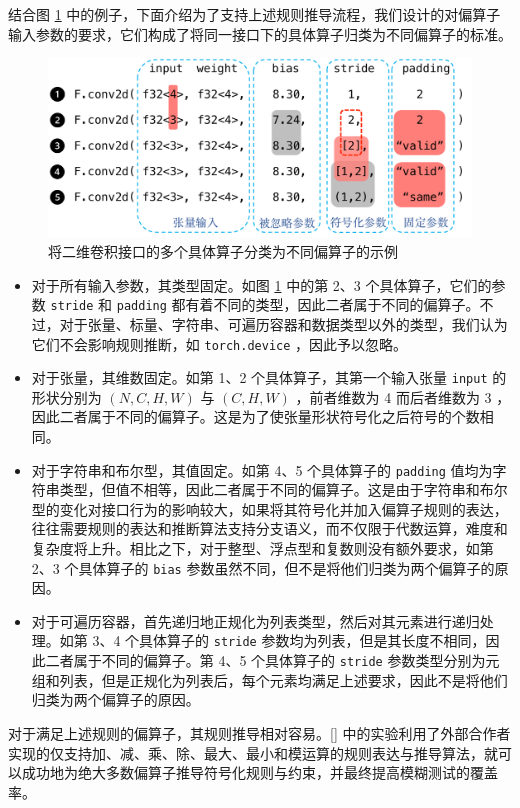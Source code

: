 结合图 \ref{fig:conv2d} 中的例子，下面介绍为了支持上述规则推导流程，我们设计的对偏算子输入参数的要求，它们构成了将同一接口下的具体算子归类为不同偏算子的标准。

\begin{figure}
    \centering
    \includegraphics[width=1.\linewidth]{thuthesis/figures/conv2d.pdf}
    \caption{将二维卷积接口的多个具体算子分类为不同偏算子的示例}
    \label{fig:conv2d}
\end{figure}

\begin{itemize}
    \item 对于所有输入参数，其类型固定。如图 \ref{fig:conv2d} 中的第 2、3 个具体算子，它们的参数 \texttt{stride} 和 \texttt{padding} 都有着不同的类型，因此二者属于不同的偏算子。不过，对于张量、标量、字符串、可遍历容器和数据类型以外的类型，我们认为它们不会影响规则推断，如 \texttt{torch.device} ，因此予以忽略。
    \item 对于张量，其维数固定。如第 1、2 个具体算子，其第一个输入张量 \texttt{input} 的形状分别为 $(N, C, H, W)$ 与 $(C, H, W)$ ，前者维数为 4 而后者维数为 3 ，因此二者属于不同的偏算子。这是为了使张量形状符号化之后符号的个数相同。
    \item 对于字符串和布尔型，其值固定。如第 4、5 个具体算子的 \texttt{padding} 值均为字符串类型，但值不相等，因此二者属于不同的偏算子。这是由于字符串和布尔型的变化对接口行为的影响较大，如果将其符号化并加入偏算子规则的表达，往往需要规则的表达和推断算法支持分支语义，而不仅限于代数运算，难度和复杂度将上升。相比之下，对于整型、浮点型和复数则没有额外要求，如第 2、3 个具体算子的 \texttt{bias} 参数虽然不同，但不是将他们归类为两个偏算子的原因。
    \item 对于可遍历容器，首先递归地正规化为列表类型，然后对其元素进行递归处理。如第 3、4 个具体算子的 \texttt{stride} 参数均为列表，但是其长度不相同，因此二者属于不同的偏算子。第 4、5 个具体算子的 \texttt{stride} 参数类型分别为元组和列表，但是正规化为列表后，每个元素均满足上述要求，因此不是将他们归类为两个偏算子的原因。
\end{itemize}
对于满足上述规则的偏算子，其规则推导相对容易。\ref{} 中的实验利用了外部合作者实现的仅支持加、减、乘、除、最大、最小和模运算的规则表达与推导算法，就可以成功地为绝大多数偏算子推导符号化规则与约束，并最终提高模糊测试的覆盖率。


